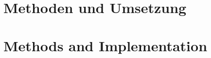 {\chapter{Methoden und Umsetzung}}
{\chapter{Methods and Implementation}}
\label{sec:methods}






